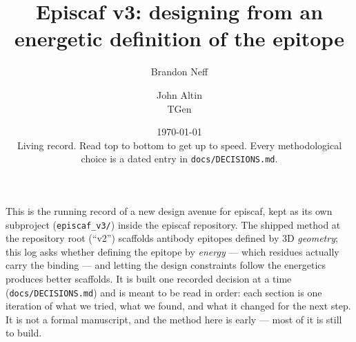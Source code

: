 \documentclass[11pt]{article}
\title{Episcaf v3: designing from an energetic definition of the epitope}
\author{Brandon Neff \and John Altin \\ \small TGen}
\date{\today\\[2pt]\small Living record. Read top to bottom to get up to speed.
Every methodological choice is a dated entry in \texttt{docs/DECISIONS.md}.}
\begin{document}
\maketitle

\noindent
This is the running record of a new design avenue for episcaf, kept as its own subproject
(\texttt{episcaf\_v3/}) inside the episcaf repository. The shipped method at the repository root
(``v2'') scaffolds antibody epitopes defined by 3D \emph{geometry}; this log asks
whether defining the epitope by \emph{energy} --- which residues actually carry the binding --- and
letting the design constraints follow the energetics produces better scaffolds. It is built one
recorded decision at a time (\texttt{docs/DECISIONS.md}) and is meant to be read in order: each
section is one iteration of what we tried, what we found, and what it changed for the next step. It
is not a formal manuscript, and the method here is early --- most of it is still to build.







\end{document}
